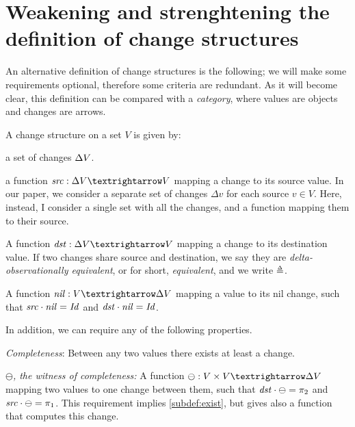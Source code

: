 \section{Weakening and strenghtening the definition of change structures}
An alternative definition of change structures is the following; we will make
some requirements optional, therefore some criteria are redundant. As it will
become clear, this definition can be compared with a \emph{category}, where
values are objects and changes are arrows.
\begin{definition}
A change structure on a set $V$ is given by:
\begin{subdefinition}
\item a set of changes $\Delta V$.
\item\label{subdef:src} a function $\Term{src} : \GD V → V$ mapping a change to
  its source value. In our paper, we consider a separate set of changes
  $\Delta v$ for each source $v \in V$. Here, instead, I consider a single set
  with all the changes, and a function mapping them to their source.
\item\label{subdef:dst} A function $\Term{dst} : \GD V → V$ mapping a change to
  its destination value. If two changes share source and destination, we say
  they are \emph{delta-observationally equivalent}, or for short,
  \emph{equivalent}, and we write $\Doe$.
\item\label{subdef:nil} A function $\Term{nil} : V → \GD V$ mapping a value to
  its nil change, such that $\mathit{src} \cdot \mathit{nil} = \mathit{Id}$ and
  $\mathit{dst} \cdot \mathit{nil} = \mathit{Id}$.
\end{subdefinition}
In addition, we can require any of the following properties.
\begin{subdefinition}[resume]
\item\label{subdef:exist} \emph{Completeness}: Between any two values there exists
  at least a change.
\item\label{subdef:ominus} \emph{$\ominus$, the witness of completeness:} A
  function $\ominus : V \times V → \GD V$ mapping two values to one change
  between them, such that $\mathit{dst} \cdot \ominus = \pi_2$ and
  $\mathit{src} \cdot \ominus = \pi_1$. This requirement implies
  \cref{subdef:exist}, but gives also a function that computes this change.


\end{subdefinition}
\end{definition}
